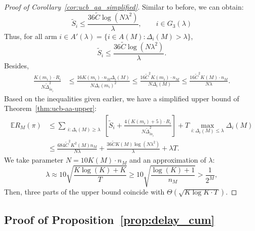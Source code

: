 \documentclass[11pt]{article}
\begin{document}
\begin{proof}[Proof of Corollary~\ref{cor:ucb_aa_simplified}]
 Similar to before, we can obtain:
 $$\tilde{S}_i\leq  \frac{36\tilde{C}\log(N \lambda^2)}{\lambda} , \quad \quad   i\in G_3(\lambda)$$
 Thus, for all arm $i\in A'(\lambda)=\{i\in A(M):\Delta_i(M)>\lambda\}$, 
 $$\tilde{S}_i\leq  \frac{36\tilde{C}\log(N \lambda^2)}{\lambda}.$$
 Besides, 
\begin{align*}
    \frac{K(m_i)\cdot R_i}{N \tilde{\Delta}_{\tilde{m}_i}^2}&\leq  \frac{16K(m_i)\cdot n_M\Delta_i(M)}{N \Delta_i(m_i)^2}\leq \frac{16\tilde{C}^2K(m_i)\cdot n_M}{N\Delta_i(M)}\leq \frac{16\tilde{C}^2K(M)\cdot n_M}{N\lambda}.
\end{align*}
 Based on the inequalities given earlier, we have a simplified upper bound of Theorem~\ref{thm:ucb-aa-upper}:
\begin{align*}
\mathbb{E}R_M(\pi)&\leq \sum_{\substack{i: \Delta_i(M) \geq \lambda}} \left[ \tilde{S}_i+\frac{4\left(K(m_i)+5\right)\cdot R_i}{N\tilde{\Delta}_{\tilde{m}_i}^2}\right] +T\max_{i:\Delta_i(M)\leq \lambda}  \Delta_i(M)\\
&\leq\frac{684\tilde{C}^2K^2(M) n_M}{N\lambda}+\frac{36\tilde{C}K(M)\log(N \lambda^2)}{\lambda}+\lambda T.
\end{align*}
We take parameter $N=10 K(M)\cdot n_M $ and an approximation of $\lambda$:
\[\lambda \approx 10\sqrt{\frac{K\log (K)+K}{T}}\geq 10\sqrt{\frac{\log (K)+1}{n_M}}>\frac{1}{2^M},\]
Then, three parts of the upper bound coincide with $\Theta \left(\sqrt{K\log K\cdot T}\right)$.

\end{proof}

\subsection{Proof of Proposition~\ref{prop:delay_cum}}
\label{sec:Proof of prop:delay_cum}
\end{document}
